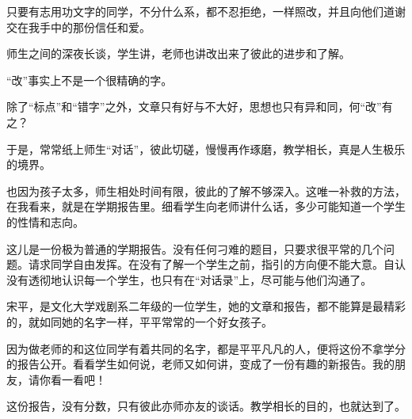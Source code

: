 \par 只要有志用功文字的同学，不分什么系，都不忍拒绝，一样照改，并且向他们道谢交在我手中的那份信任和爱。
\par 师生之间的深夜长谈，学生讲，老师也讲改出来了彼此的进步和了解。
\par “改”事实上不是一个很精确的字。
\par 除了“标点”和“错字”之外，文章只有好与不大好，思想也只有异和同，何“改”有之？
\par 于是，常常纸上师生“对话”，彼此切磋，慢慢再作琢磨，教学相长，真是人生极乐的境界。
\par 也因为孩子太多，师生相处时间有限，彼此的了解不够深入。这唯一补救的方法，在我看来，就是在学期报告里。细看学生向老师讲什么话，多少可能知道一个学生的性情和志向。
\par 这儿是一份极为普通的学期报告。没有任何刁难的题目，只要求很平常的几个问题。请求同学自由发挥。在没有了解一个学生之前，指引的方向便不能大意。自认没有透彻地认识每一个学生，也只有在“对话录”上，尽可能与他们沟通了。
\par 宋平，是文化大学戏剧系二年级的一位学生，她的文章和报告，都不能算是最精彩的，就如同她的名字一样，平平常常的一个好女孩子。
\par 因为做老师的和这位同学有着共同的名字，都是平平凡凡的人，便将这份不拿学分的报告公开。看看学生如何说，老师又如何讲，变成了一份有趣的新报告。我的朋友，请你看一看吧！
\par 这份报告，没有分数，只有彼此亦师亦友的谈话。教学相长的目的，也就达到了。
